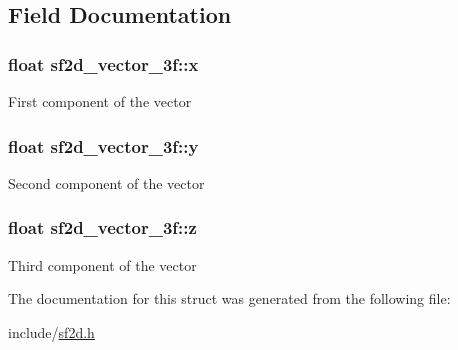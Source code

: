 \subsection{Field Documentation}
\hypertarget{structsf2d__vector__3f_acfe35bcf39de79f3edd634ad1bce3d74}{
\subsubsection[{x}]{\setlength{\rightskip}{0pt plus 5cm}float sf2d\-\_\-vector\-\_\-3f\-::x}}\label{structsf2d__vector__3f_acfe35bcf39de79f3edd634ad1bce3d74}
First component of the vector \hypertarget{structsf2d__vector__3f_ac7f2e5651290011f9c1fbe017dec219e}{
\subsubsection[{y}]{\setlength{\rightskip}{0pt plus 5cm}float sf2d\-\_\-vector\-\_\-3f\-::y}}\label{structsf2d__vector__3f_ac7f2e5651290011f9c1fbe017dec219e}
Second component of the vector \hypertarget{structsf2d__vector__3f_ab8ae4e1b464f00ac0d6dc3714f94ac18}{
\subsubsection[{z}]{\setlength{\rightskip}{0pt plus 5cm}float sf2d\-\_\-vector\-\_\-3f\-::z}}\label{structsf2d__vector__3f_ab8ae4e1b464f00ac0d6dc3714f94ac18}
Third component of the vector 

The documentation for this struct was generated from the following file\-:\begin{DoxyCompactItemize}
\item 
include/\hyperlink{sf2d_8h}{sf2d.\-h}\end{DoxyCompactItemize}
